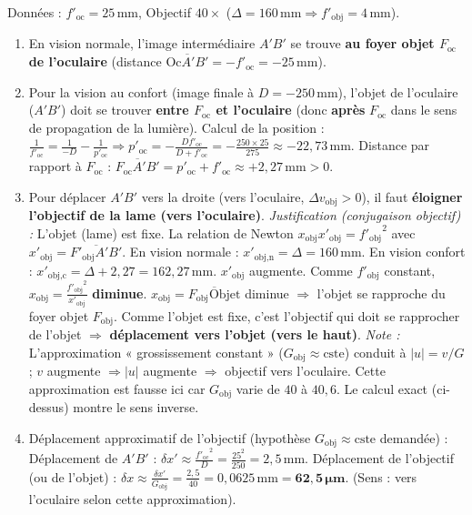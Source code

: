 \documentclass[11pt]{article}
\begin{document}
\begin{corrige}
Données : $f'_{\text{oc}} = 25\,\text{mm}$, Objectif $40\times$ ($\Delta = 160\,\text{mm} \Rightarrow f'_{\text{obj}} = 4\,\text{mm}$).

\begin{enumerate}
    \item En vision normale, l'image intermédiaire $A'B'$ se trouve \textbf{au foyer objet $F_{\text{oc}}$ de l'oculaire} (distance $\overline{\text{Oc}A'B'} = -f'_{\text{oc}} = -25\,\text{mm}$).
    \item Pour la vision au confort (image finale à $D = -250\,\text{mm}$), l'objet de l'oculaire ($A'B'$) doit se trouver \textbf{entre $F_{\text{oc}}$ et l'oculaire} (donc \textbf{après} $F_{\text{oc}}$ dans le sens de propagation de la lumière).
    Calcul de la position : $\frac{1}{f'_{\text{oc}}} = \frac{1}{-D} - \frac{1}{p'_{\text{oc}}} \Rightarrow p'_{\text{oc}} = -\frac{D f'_{\text{oc}}}{D+f'_{\text{oc}}} = -\frac{250 \times 25}{275} \approx -22,73\,\text{mm}$.
    Distance par rapport à $F_{\text{oc}}$ : $\overline{F_{\text{oc}}A'B'} = p'_{\text{oc}} + f'_{\text{oc}} \approx +2,27\,\text{mm} > 0$.
    \item Pour déplacer $A'B'$ vers la droite (vers l'oculaire, $\Delta v_{\text{obj}} > 0$), il faut \textbf{éloigner l'objectif de la lame (vers l'oculaire)}.
    \emph{Justification (conjugaison objectif) :} L'objet (lame) est fixe. La relation de Newton $x_{\text{obj}} x'_{\text{obj}} = {f'_{\text{obj}}}^2$ avec $x'_{\text{obj}} = \overline{F'_{\text{obj}}A'B'}$.
    En vision normale : $x'_{\text{obj,n}} = \Delta = 160\,\text{mm}$.
    En vision confort : $x'_{\text{obj,c}} = \Delta + 2,27 = 162,27\,\text{mm}$.
    $x'_{\text{obj}}$ augmente. Comme $f'_{\text{obj}}$ constant, $x_{\text{obj}} = \frac{{f'_{\text{obj}}}^2}{x'_{\text{obj}}}$ \textbf{diminue}.
    $x_{\text{obj}} = \overline{F_{\text{obj}}\text{Objet}}$ diminue $\Rightarrow$ l'objet se rapproche du foyer objet $F_{\text{obj}}$.
    Comme l'objet est fixe, c'est l'objectif qui doit se rapprocher de l'objet $\Rightarrow$ \textbf{déplacement vers l'objet (vers le haut)}.
    \emph{Note :} L'approximation « grossissement constant » ($G_{\text{obj}} \approx \text{cste}$) conduit à $|u| = v/G$ ; $v$ augmente $\Rightarrow |u|$ augmente $\Rightarrow$ objectif vers l'oculaire. Cette approximation est fausse ici car $G_{\text{obj}}$ varie de $40$ à $40,6$. Le calcul exact (ci-dessus) montre le sens inverse.
    \item Déplacement approximatif de l'objectif (hypothèse $G_{\text{obj}} \approx \text{cste}$ demandée) :
    Déplacement de $A'B'$ : $\delta x' \approx \frac{{f'_{\text{oc}}}^2}{D} = \frac{25^2}{250} = 2,5\,\text{mm}$.
    Déplacement de l'objectif (ou de l'objet) : $\delta x \approx \frac{\delta x'}{G_{\text{obj}}} = \frac{2,5}{40} = 0,0625\,\text{mm} = \mathbf{62,5\,\mu\text{m}}$.
    (Sens : vers l'oculaire selon cette approximation).
\end{enumerate}
\end{corrige}
\end{document}
